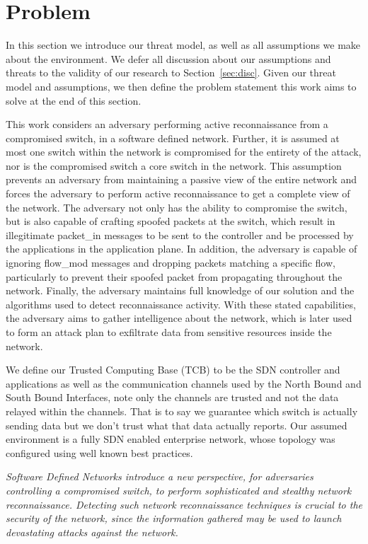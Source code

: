 \section{Problem}
\label{sec:prob}

In this section we introduce our threat model, as well as all
assumptions we make about the environment. We defer all discussion
about our assumptions and threats to the validity of our research to
Section~\ref{sec:disc}. Given our threat model and assumptions, we then
define the problem statement this work aims to solve at the end of this
section. 

 This work considers an adversary performing
active reconnaissance from a compromised switch, in a software defined
network. Further, it is assumed at most one switch within the network 
is compromised for the entirety of the attack, nor is the compromised 
switch a core switch in the network. This assumption prevents an 
adversary from maintaining a passive view of the entire network and 
forces the adversary to perform active reconnaissance to get a complete
view of the network. The adversary not only has the ability to 
compromise the switch, but is also capable of crafting spoofed packets
at the switch, which result in illegitimate packet\_in messages to be 
sent to the controller and be processed by the applications in the 
application plane. In addition, the adversary is capable of ignoring 
flow\_mod messages and dropping packets matching a specific flow, 
particularly to prevent their spoofed packet from propagating throughout
the network. Finally, the adversary maintains full knowledge of our 
solution and the algorithms used to detect reconnaissance activity. 
With these stated capabilities, the adversary aims to gather 
intelligence about the network, which is later used to form an attack
plan to exfiltrate data from sensitive resources inside the network.

We define our Trusted Computing Base (TCB) to be the SDN controller and
applications as well as the communication channels used by the North
Bound and South Bound Interfaces, note only the channels are trusted and
not the data relayed within the channels. That is to say we guarantee
which switch is actually sending data but we don't trust what that data
actually reports. Our assumed environment is a fully SDN enabled 
enterprise network, whose topology was configured using well known best 
practices.

 \textit{Software Defined Networks
introduce a new perspective, for adversaries controlling a compromised
switch, to perform sophisticated and stealthy network reconnaissance.
Detecting such network reconnaissance techniques is crucial to the
security of the network, since the information gathered may be used to
launch devastating attacks against the network.}
